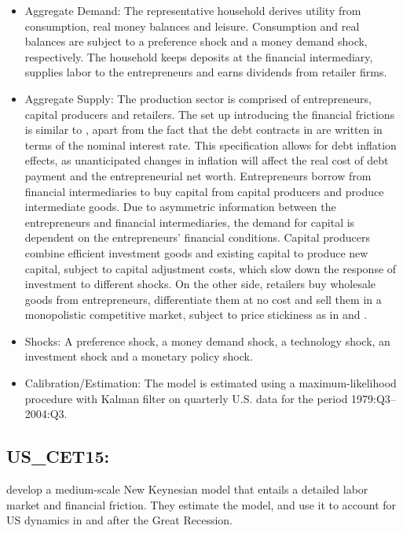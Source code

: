 \documentclass[11pt,a4paper]{article}
\begin{document}
	\begin{itemize}
		
		\item Aggregate Demand: The representative household derives utility from consumption, real money balances and leisure. Consumption and real balances are subject to a preference shock and a money demand shock, respectively. The household keeps deposits at the financial intermediary, supplies labor to the entrepreneurs and earns dividends from retailer firms.
		
		\item Aggregate Supply: The production sector is comprised of entrepreneurs, capital producers and retailers. The set up introducing the financial frictions is similar to \cite{BernankeGertlerGilchrist1999}, apart from the fact that the debt contracts in \cite{ChristensenDib2008} are written in terms of the nominal interest rate. This specification allows for debt inflation effects, as unanticipated changes in inflation will affect the real cost of debt payment and the entrepreneurial net worth. Entrepreneurs borrow from financial intermediaries to buy capital from capital producers and produce intermediate goods. Due to asymmetric information between the entrepreneurs and financial intermediaries, the demand for capital is dependent on the entrepreneurs' financial conditions. Capital producers combine efficient investment goods and existing capital to produce new capital, subject to capital adjustment costs, which slow down the response of investment to different shocks. On the other side, retailers buy wholesale goods from entrepreneurs, differentiate them at no cost and sell them in a monopolistic competitive market, subject to price stickiness as in \cite{Calvo1983} and \cite{Yun1996}.
		
		\item Shocks: A preference shock, a money demand shock, a technology shock, an investment shock and a monetary policy shock.
		
		\item Calibration/Estimation: The model is estimated using a maximum-likelihood procedure with Kalman filter on quarterly U.S. data for the period 1979:Q3--2004:Q3.
		
		
	\end{itemize}
	
	\subsection{US\_CET15: \texorpdfstring{\cite{christiano2015eichenbaum}}{Christiano et al. (2015)}}
	\label{USCET15}
	\cite{christiano2015eichenbaum} develop a medium-scale New Keynesian model that entails a detailed labor market and financial friction. They estimate the model, and use it to account for US dynamics in and after the Great Recession.
	
\end{document}
